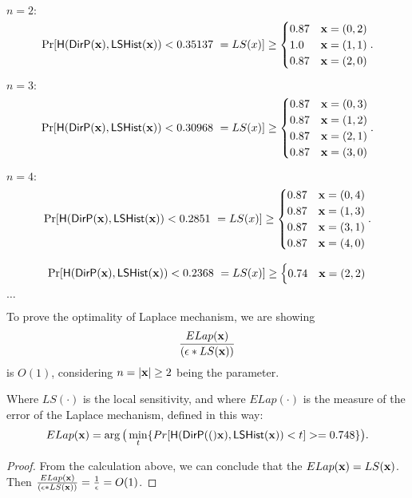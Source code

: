 \documentclass{article}
\begin{document}
\newpage
{\small

\noindent $n = 2:$
\[
\Pr[\hlg(\bysinfer{\dataobs}, \ilapmech(\dataobs)) < 0.35137 ~ = LS(x)]
\geq \begin{cases}
	0.87	& \dataobs = (0, 2)\\
%
	1.0		& \dataobs = (1, 1)\\
%
	0.87	& \dataobs = (2, 0)\\
\end{cases}.
\]


\noindent $n = 3:$
\[
\Pr[\hlg(\bysinfer{\dataobs}, \ilapmech(\dataobs)) < 0.30968 ~ = LS(x)]
\geq \begin{cases}
 	0.87
	& \dataobs = (0, 3)\\
%
 	0.87
	& \dataobs = (1, 2)\\
%
 	0.87
	& \dataobs = (2, 1)\\
%
	0.87
	& \dataobs = (3, 0)
\end{cases}.
\]

\noindent $n = 4:$
\[
\Pr[\hlg(\bysinfer{\dataobs}, \ilapmech(\dataobs)) < 0.2851 ~ = LS(x)]
\geq 
\begin{cases}
 	0.87
	& \dataobs = (0, 4)\\
%
 	0.87
	& \dataobs = (1, 3)\\
%
	0.87
	& \dataobs = (3, 1)\\
%
	0.87
	& \dataobs = (4, 0)
\end{cases}.
\]

\[
\Pr[\mathsf{H}(\mathsf{DirP}(\textbf{x}), \mathsf{LSHist}(\textbf{x})) < 0.2368 ~ = LS(x)]
\geq
\begin{cases}
0.74 & \textbf{x} = (2, 2)
\end{cases}
\]




$\dots$

\begin{thm}
To prove the optimality of Laplace mechanism, we are showing 
\[
\frac{ELap(\textbf{x})}{(\epsilon*LS(\textbf{x}))}
\]
is $O(1)$, considering $n=|\textbf{x}| \geq 2$ being the parameter.

Where $LS(\cdot)$ is the local sensitivity, and where $ELap(\cdot)$ is the measure of the error of the Laplace mechanism, defined in this way:
\[
ELap(\textbf{x}) = \arg\big( \min\limits_{t}\{Pr[\mathsf{H}(\mathsf{DirP}(()\textbf{x}), \mathsf{LSHist}(\textbf{x}))< t] >= 0.748\} \big).
\]
\end{thm}

\begin{proof}
From the calculation above, we can conclude that the $ELap(\textbf{x}) = LS(\textbf{x})$.\\
Then $\frac{ELap(\textbf{x})}{(\epsilon*LS(\textbf{x}))} = \frac{1}{\epsilon} = O(1)$.


\end{proof}}
\end{document}
